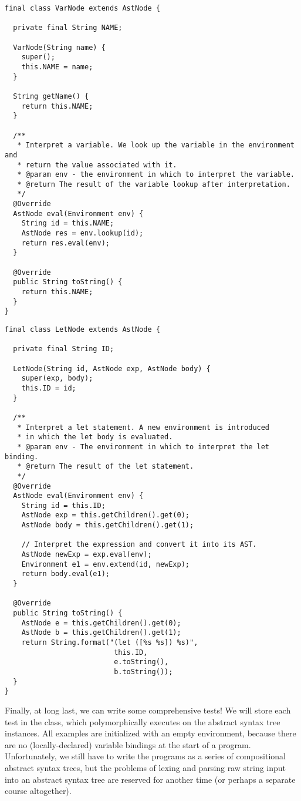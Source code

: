 \begin{lstlisting}[language=MyJava]
final class VarNode extends AstNode {

  private final String NAME;

  VarNode(String name) {
    super();
    this.NAME = name;
  }

  String getName() {
    return this.NAME;
  }

  /**
   * Interpret a variable. We look up the variable in the environment and
   * return the value associated with it.
   * @param env - the environment in which to interpret the variable.
   * @return The result of the variable lookup after interpretation.
   */
  @Override
  AstNode eval(Environment env) {
    String id = this.NAME;
    AstNode res = env.lookup(id);
    return res.eval(env);
  }

  @Override
  public String toString() { 
    return this.NAME; 
  }
}
\end{lstlisting}
  
\begin{lstlisting}[language=MyJava]
final class LetNode extends AstNode {

  private final String ID;

  LetNode(String id, AstNode exp, AstNode body) {
    super(exp, body);
    this.ID = id;
  }

  /**
   * Interpret a let statement. A new environment is introduced 
   * in which the let body is evaluated.
   * @param env - The environment in which to interpret the let binding.
   * @return The result of the let statement.
   */
  @Override
  AstNode eval(Environment env) {
    String id = this.ID;
    AstNode exp = this.getChildren().get(0);
    AstNode body = this.getChildren().get(1);

    // Interpret the expression and convert it into its AST.
    AstNode newExp = exp.eval(env);
    Environment e1 = env.extend(id, newExp);
    return body.eval(e1);
  }

  @Override
  public String toString() {
    AstNode e = this.getChildren().get(0);
    AstNode b = this.getChildren().get(1);
    return String.format("(let ([%s %s]) %s)", 
                          this.ID, 
                          e.toString(), 
                          b.toString());
  }
}
\end{lstlisting}

Finally, at long last, we can write some comprehensive tests! 
We will store each test in the  class, which polymorphically executes  on the abstract syntax tree instances. 
All examples are initialized with an empty environment, because there are no (locally-declared) variable bindings at the start of a program. 
Unfortunately, we still have to write the programs as a series of compositional abstract syntax trees, but the problems of lexing and parsing raw string input into an abstract syntax tree are reserved for another time (or perhaps a separate course altogether). 

